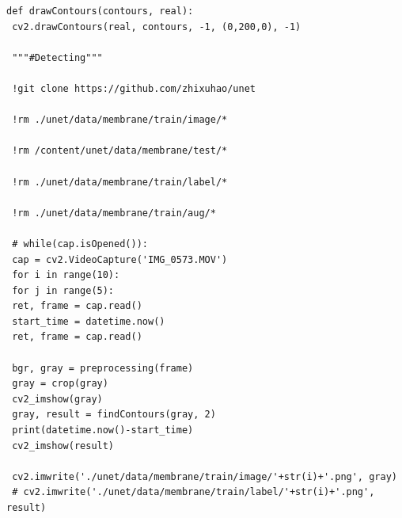 \documentclass[times]{itmo-student-thesis}
\begin{document}
\begin{lstlisting}[caption={Метод водораздела},label={lstX}]
 def drawContours(contours, real):
 cv2.drawContours(real, contours, -1, (0,200,0), -1)
 
 """#Detecting"""
 
 !git clone https://github.com/zhixuhao/unet
 
 !rm ./unet/data/membrane/train/image/*
 
 !rm /content/unet/data/membrane/test/*
 
 !rm ./unet/data/membrane/train/label/*
 
 !rm ./unet/data/membrane/train/aug/*
 
 # while(cap.isOpened()):
 cap = cv2.VideoCapture('IMG_0573.MOV')
 for i in range(10):
 for j in range(5):
 ret, frame = cap.read()
 start_time = datetime.now()
 ret, frame = cap.read()
 
 bgr, gray = preprocessing(frame)
 gray = crop(gray)
 cv2_imshow(gray)
 gray, result = findContours(gray, 2)
 print(datetime.now()-start_time)
 cv2_imshow(result)
 
 cv2.imwrite('./unet/data/membrane/train/image/'+str(i)+'.png', gray)
 # cv2.imwrite('./unet/data/membrane/train/label/'+str(i)+'.png', result)
  \end{lstlisting}
  
  
\end{document}
